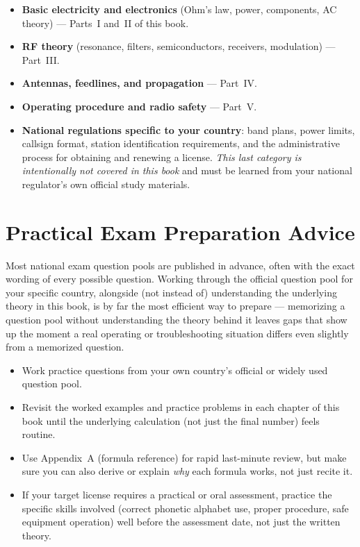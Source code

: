 \begin{itemize}
\item \textbf{Basic electricity and electronics} (Ohm's law, power,
components, AC theory) --- Parts~I and~II of this book.
\item \textbf{RF theory} (resonance, filters, semiconductors, receivers,
modulation) --- Part~III.
\item \textbf{Antennas, feedlines, and propagation} --- Part~IV.
\item \textbf{Operating procedure and radio safety} --- Part~V.
\item \textbf{National regulations specific to your country}: band
plans, power limits, callsign format, station identification
requirements, and the administrative process for obtaining and renewing
a license. \emph{This last category is intentionally not covered in
this book} and must be learned from your national regulator's own
official study materials.
\end{itemize}

\section{Practical Exam Preparation Advice}

\begin{examtip}
Most national exam question pools are published in advance, often with
the exact wording of every possible question. Working through the
official question pool for your specific country, alongside (not
instead of) understanding the underlying theory in this book, is by far
the most efficient way to prepare --- memorizing a question pool without
understanding the theory behind it leaves gaps that show up the moment a
real operating or troubleshooting situation differs even slightly from
a memorized question.
\end{examtip}

\begin{itemize}
\item Work practice questions from your own country's official or
widely used question pool.
\item Revisit the worked examples and practice problems in each chapter
of this book until the underlying calculation (not just the final
number) feels routine.
\item Use Appendix~A (formula reference) for rapid last-minute review,
but make sure you can also derive or explain \emph{why} each formula
works, not just recite it.
\item If your target license requires a practical or oral assessment,
practice the specific skills involved (correct phonetic alphabet use,
proper procedure, safe equipment operation) well before the assessment
date, not just the written theory.
\end{itemize}

